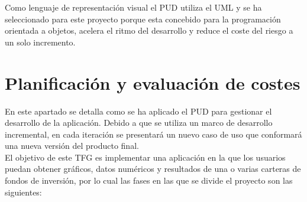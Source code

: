\documentclass[12pt, a4paper]{article}
\begin{document}
Como lenguaje de representación visual el \gls{PUD} utiliza el \gls{UML} y se ha seleccionado para este proyecto porque esta concebido para la programación orientada a objetos, acelera el ritmo del desarrollo y reduce el coste del riesgo a un solo incremento.   

\newpage 

\section{Planificación y evaluación de costes}

En este apartado se detalla como se ha aplicado el \gls{PUD} para gestionar el desarrollo de la aplicación. Debido a que se utiliza un marco de desarrollo incremental, en cada iteración se presentará un nuevo caso de uso que conformará una nueva versión del producto final.\\

El objetivo de este \gls{TFG} es implementar una aplicación en la que los usuarios puedan obtener gráficos, datos numéricos y resultados de una o varias carteras de fondos de inversión, por lo cual las fases en las que se divide el proyecto son las siguientes:\\


\end{document}
